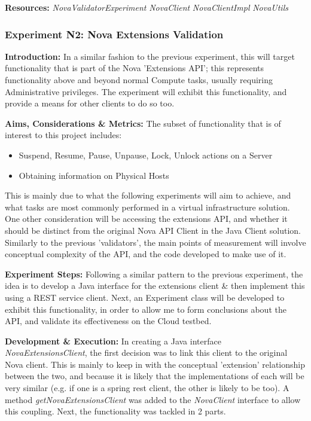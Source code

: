 \textbf{Resources:} \textit{NovaValidatorExperiment} \textit{NovaClient} \textit{NovaClientImpl} \textit{NovaUtils}

\subsubsection{Experiment N2: Nova Extensions Validation}

\textbf{Introduction:} In a similar fashion to the previous experiment, this will target functionality that is part of the Nova 'Extensions API'; this represents functionality above and beyond normal Compute tasks, usually requiring Administrative privileges. The experiment will exhibit this functionality, and provide a means for other clients to do so too. 

\textbf{Aims, Considerations \& Metrics:}
The subset of functionality that is of interest to this project includes:

	\begin{itemize}
	\itemsep0em
	\item Suspend, Resume, Pause, Unpause, Lock, Unlock actions on a Server
	\item Obtaining information on Physical Hosts 
	\end{itemize}

This is mainly due to what the following experiments will aim to achieve, and what tasks are most commonly performed in a virtual infrastructure solution. 
One other consideration will be accessing the extensions API, and whether it should be distinct from the original Nova API Client in the Java Client solution.
Similarly to the previous 'validators', the main points of measurement will involve conceptual complexity of the API, and the code developed to make use of it. 

\textbf{Experiment Steps:}
Following a similar pattern to the previous experiment, the idea is to develop a Java interface for the extensions client \& then implement this using a REST service client. 
Next, an Experiment class will be developed to exhibit this functionality, in order to allow me to form conclusions about the API, and validate its effectiveness on the Cloud testbed.
 
\textbf{Development \& Execution:} In creating a Java interface \textit{NovaExtensionsClient}, the first decision was to link this client to the original Nova client. This is mainly to keep in with the conceptual 'extension' relationship between the two, and because it is likely that the implementations of each will be very similar (e.g. if one is a spring rest client, the other is likely to be too). A method \textit{getNovaExtensionsClient} was added to the \textit{NovaClient} interface to allow this coupling. 
Next, the functionality was tackled in 2 parts.

